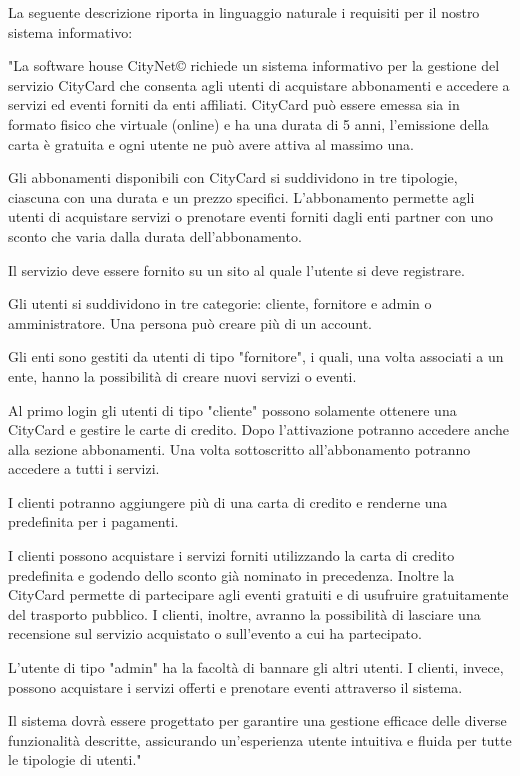 La seguente descrizione riporta in linguaggio naturale i requisiti per il nostro sistema informativo:

\begin{adjustwidth}{}{}
"La software house CityNet© richiede un sistema informativo per la gestione del servizio CityCard che consenta agli utenti di acquistare abbonamenti e accedere a servizi ed eventi forniti da enti affiliati. CityCard può essere emessa sia in formato fisico che virtuale (online) e ha una durata di 5 anni, l'emissione della carta è gratuita e ogni utente ne può avere attiva al massimo una.

Gli abbonamenti disponibili con CityCard si suddividono in tre tipologie, ciascuna con una durata e un prezzo specifici. L'abbonamento permette agli utenti di acquistare servizi o prenotare eventi forniti dagli enti partner con uno sconto che varia dalla durata dell'abbonamento.

Il servizio deve essere fornito su un sito al quale l'utente si deve registrare.

Gli utenti si suddividono in tre categorie: cliente, fornitore e admin o amministratore. Una persona può creare più di un account.

Gli enti sono gestiti da utenti di tipo "fornitore", i quali, una volta associati a un ente, hanno la possibilità di creare nuovi servizi o eventi. 

Al primo login gli utenti di tipo "cliente" possono solamente ottenere una CityCard e gestire le carte di credito. Dopo l'attivazione potranno accedere anche alla sezione abbonamenti. Una volta sottoscritto all'abbonamento potranno accedere a tutti i servizi.

I clienti potranno aggiungere più di una carta di credito e renderne una predefinita per i pagamenti.

I clienti possono acquistare i servizi forniti utilizzando la carta di credito predefinita e godendo dello sconto già nominato in precedenza. Inoltre la CityCard permette di partecipare agli eventi gratuiti e di usufruire gratuitamente del trasporto pubblico. I clienti, inoltre, avranno la possibilità di lasciare una recensione sul servizio acquistato o sull'evento a cui ha partecipato.

L'utente di tipo "admin" ha la facoltà di bannare gli altri utenti. I clienti, invece, possono acquistare i servizi offerti e prenotare eventi attraverso il sistema.

Il sistema dovrà essere progettato per garantire una gestione efficace delle diverse funzionalità descritte, assicurando un'esperienza utente intuitiva e fluida per tutte le tipologie di utenti."
\end{adjustwidth}
 